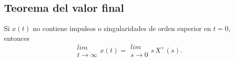 \subsection{Teorema del valor final}

 Si $x(t)$ no contiene impulsos o singularidades de orden superior en $t=0$, entonces
 \begin{equation}
        \begin{array}{c}
                lim     \\
                t \rightarrow \infty
        \end{array}
        x(t) =        
        \begin{array}{c}
                lim     \\
                s \rightarrow 0
        \end{array}
        s \, X^{+}(s).
 \end{equation}


